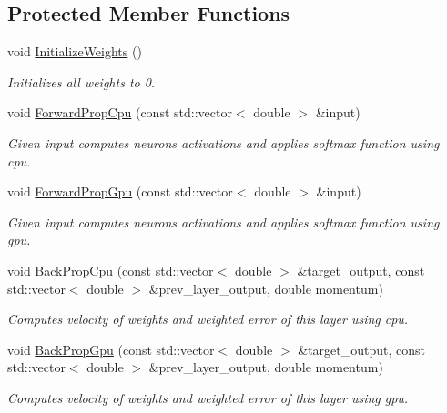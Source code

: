 \subsection*{Protected Member Functions}
\begin{DoxyCompactItemize}
\item 
\mbox{\label{classneuralnet_1_1SoftmaxOutputLayer_a80635dc564f1edc46090c820607243d1}} 
void \hyperlink{classneuralnet_1_1SoftmaxOutputLayer_a80635dc564f1edc46090c820607243d1}{Initialize\+Weights} ()
\begin{DoxyCompactList}\small\item\em Initializes all weights to 0. \end{DoxyCompactList}\item 
void \hyperlink{classneuralnet_1_1SoftmaxOutputLayer_a6a18e1e7fc94cb7f3d66dfad2dcb1f85}{Forward\+Prop\+Cpu} (const std\+::vector$<$ double $>$ \&input)
\begin{DoxyCompactList}\small\item\em Given input computes neurons\textquotesingle{} activations and applies softmax function using cpu. \end{DoxyCompactList}\item 
void \hyperlink{classneuralnet_1_1SoftmaxOutputLayer_acb4f6f8739a3dedde111f11b548899f7}{Forward\+Prop\+Gpu} (const std\+::vector$<$ double $>$ \&input)
\begin{DoxyCompactList}\small\item\em Given input computes neurons\textquotesingle{} activations and applies softmax function using gpu. \end{DoxyCompactList}\item 
void \hyperlink{classneuralnet_1_1SoftmaxOutputLayer_a7360169d36832228b4938f9ff469bb59}{Back\+Prop\+Cpu} (const std\+::vector$<$ double $>$ \&target\+\_\+output, const std\+::vector$<$ double $>$ \&prev\+\_\+layer\+\_\+output, double momentum)
\begin{DoxyCompactList}\small\item\em Computes velocity of weights and weighted error of this layer using cpu. \end{DoxyCompactList}\item 
void \hyperlink{classneuralnet_1_1SoftmaxOutputLayer_af3308eebc5a7acc982f4ac0b55d34fc3}{Back\+Prop\+Gpu} (const std\+::vector$<$ double $>$ \&target\+\_\+output, const std\+::vector$<$ double $>$ \&prev\+\_\+layer\+\_\+output, double momentum)
\begin{DoxyCompactList}\small\item\em Computes velocity of weights and weighted error of this layer using gpu. \end{DoxyCompactList}\end{DoxyCompactItemize}
